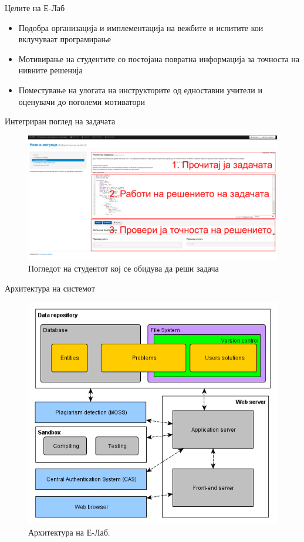 \begin{frame}{Целите на Е-Лаб}
	\begin{itemize}[<+-| alert@+>]
	  \item Подобра организација и имплементација на вежбите и испитите кои
	  вклучуваат програмирање
	  \item Мотивирање на студентите со постојана повратна информација за
	  точноста на нивните решенија
	  \item Поместување на улогата на инструкторите од едноставни учители и
	  оценувачи до поголеми мотиватори
	\end{itemize}
\end{frame}

\begin{frame}{Интегриран поглед на задачата}
	\begin{figure}
		\centering
		\includegraphics[width=.99\textwidth]{images/pv}
		\caption{Погледот на студентот кој се обидува да реши задача}
		\label{fig:student_screen}
	\end{figure}
\end{frame}

\begin{frame}{Архитектура на системот}
	\begin{figure}
	\centering
		\includegraphics[width=.70\textwidth]{images/architecture}
		\caption{Архитектура на Е-Лаб.}
		\label{fig:architecture}
	\end{figure}
\end{frame}

